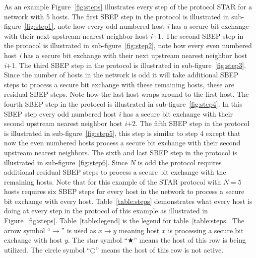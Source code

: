 \documentclass[a4paper,12pt,pdftex]{article}
\begin{document}
As an example Figure~\ref{fig:steps} illustrates every step of the protocol STAR for a network with 5 hosts. The first SBEP step in the protocol is illustrated in sub-figure~\ref{fig:step1}, note how every odd numbered host \textit{i} has a secure bit exchange with their next upstream nearest neighbor host \textit{i}+1. The second SBEP step in the protocol is illustrated in sub-figure~\ref{fig:step2}, note how every even numbered host \textit{i} has a secure bit exchange with their next upstream nearest neighbor host \textit{i}+1. The third SBEP step in the protocol is illustrated in sub-figure~\ref{fig:step3}. Since the number of hosts in the network is odd it will take additional SBEP steps to process a secure bit exchange with these remaining hosts, these are residual SBEP steps. Note how the last host wraps around to the first host. The fourth SBEP step in the protocol is illustrated in sub-figure~\ref{fig:step4}. In this SBEP step every odd numbered host \textit{i} has a secure bit exchange with their second upstream nearest neighbor host \textit{i}+2. The fifth SBEP step in the protocol is illustrated in sub-figure~\ref{fig:step5}, this step is similar to step 4 except that now the even numbered hosts process a secure bit exchange with their second upstream nearest neighbors. The sixth and last SBEP step in the protocol is illustrated in sub-figure~\ref{fig:step6}. Since $N$ is odd the protocol requires additional residual SBEP steps to process a secure bit exchange with the remaining hosts. Note that for this example of the STAR protocol with $N=5$ hosts requires six SBEP steps for every host in the network to process a secure bit exchange with every host. Table~\ref{table:steps} demonstrates what every host is doing at every step in the protocol of this example as illustrated in Figure~\ref{fig:steps}. Table~\ref{table:legend} is the legend for table~\ref{table:steps}. The arrow symbol ``$\rightarrow$'' is used as $x \rightarrow y$ meaning host $x$ is processing a secure bit exchange with host $y$. The star symbol ``$\bigstar$'' means the host of this row is being utilized. The circle symbol ``$\bigcirc$'' means the host of this row is not active.
\end{document}

